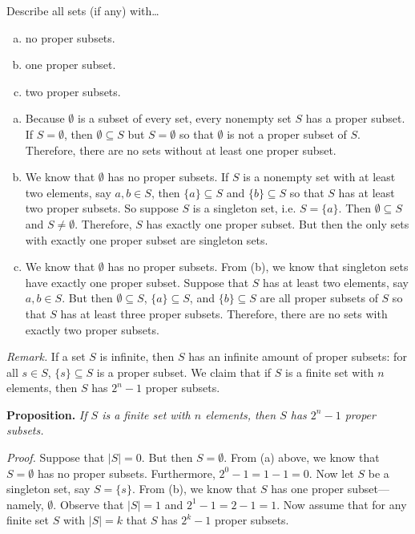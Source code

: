 \documentclass[11pt,letterpaper]{article}
\begin{document}

 Describe all sets (if any) with\dots
        \begin{enumerate}[(a)] 
        \item no proper subsets. 
        \item one proper subset. 
        \item two proper subsets. 
        \end{enumerate} \pspace

\sol
\begin{enumerate}[(a)]
\item Because $\emptyset$ is a subset of every set, every nonempty set $S$ has a proper subset. If $S= \emptyset$, then $\emptyset \subseteq S$ but $S= \emptyset$ so that $\emptyset$ is not a proper subset of $S$. Therefore, there are no sets without at least one proper subset. 

\item We know that $\emptyset$ has no proper subsets. If $S$ is a nonempty set with at least two elements, say $a, b \in S$, then $\{ a \} \subseteq S$ and $\{ b \} \subseteq S$ so that $S$ has at least two proper subsets. So suppose $S$ is a singleton set, i.e. $S= \{ a \}$. Then $\emptyset \subseteq S$ and $S \neq \emptyset$. Therefore, $S$ has exactly one proper subset. But then the only sets with exactly one proper subset are singleton sets. 

\item We know that $\emptyset$ has no proper subsets. From (b), we know that singleton sets have exactly one proper subset. Suppose that $S$ has at least two elements, say $a, b \in S$. But then $\emptyset \subseteq S$, $\{ a \} \subseteq S$, and $\{ b \} \subseteq S$ are all proper subsets of $S$ so that $S$ has at least three proper subsets. Therefore, there are no sets with exactly two proper subsets. 
\end{enumerate}

{\itshape Remark.} If a set $S$ is infinite, then $S$ has an infinite amount of proper subsets: for all $s \in S$, $\{ s \} \subseteq S$ is a proper subset. We claim that if $S$ is a finite set with $n$ elements, then $S$ has $2^n - 1$ proper subsets. 

{\bfseries Proposition.} {\itshape If $S$ is a finite set with $n$ elements, then $S$ has $2^n - 1$ proper subsets.} 

{\noindent\itshape Proof. } Suppose that $|S|= 0$. But then $S= \emptyset$. From (a) above, we know that $S= \emptyset$ has no proper subsets. Furthermore, $2^0 - 1= 1 - 1= 0$. Now let $S$ be a singleton set, say $S= \{ s \}$. From (b), we know that $S$ has one proper subset---namely, $\emptyset$. Observe that $|S|= 1$ and $2^1 - 1 = 2 - 1= 1$. Now assume that for any finite set $S$ with $|S|= k$ that $S$ has $2^k - 1$ proper subsets. 
\end{document}
